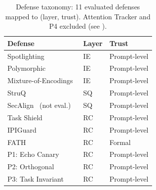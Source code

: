 \begin{table}[t]
\centering
\small
\caption{Defense taxonomy: 11 evaluated defenses mapped to (layer, trust). Attention Tracker and P4 excluded (see ).}
\label{tab:taxonomy}
\begin{tabular}{lll}
\toprule
Defense & Layer & Trust \\
\midrule
Spotlighting~\cite{hines2024defending} & IE & Prompt-level \\
Polymorphic~\cite{wang2025protect} & IE & Prompt-level \\
Mixture-of-Encodings~\cite{zhang2025defense} & IE & Prompt-level \\
StruQ~\cite{chen2024struq} & SQ & Prompt-level \\
SecAlign~\cite{chen2024secalign} (not eval.) & SQ & Prompt-level \\
Task Shield~\cite{jia2025task} & RC & Prompt-level \\
IPIGuard~\cite{an2025ipiguard} & RC & Prompt-level \\
FATH~\cite{wang2024fath} & RC & Formal \\
P1: Echo Canary & RC & Prompt-level \\
P2: Orthogonal & RC & Prompt-level \\
P3: Task Invariant & RC & Prompt-level \\
\bottomrule
\end{tabular}
\end{table}

